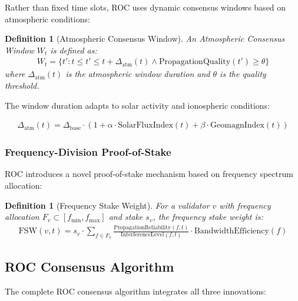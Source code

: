 \documentclass[11pt,a4paper]{article}
\newtheorem{definition}[theorem]{Definition}
\begin{document}
Rather than fixed time slots, ROC uses dynamic consensus windows based on atmospheric conditions:

\begin{definition}[Atmospheric Consensus Window]
An Atmospheric Consensus Window $W_t$ is defined as:
\begin{align}
W_t = \{t' : t \leq t' \leq t + \Delta_{\text{atm}}(t) \land \text{PropagationQuality}(t') \geq \theta\}
\end{align}
where $\Delta_{\text{atm}}(t)$ is the atmospheric window duration and $\theta$ is the quality threshold.
\end{definition}

The window duration adapts to solar activity and ionospheric conditions:

\begin{align}
\Delta_{\text{atm}}(t) = \Delta_{\text{base}} \cdot \left(1 + \alpha \cdot \text{SolarFluxIndex}(t) + \beta \cdot \text{GeomagnIndex}(t)\right)
\end{align}

\subsubsection{Frequency-Division Proof-of-Stake}

ROC introduces a novel proof-of-stake mechanism based on frequency spectrum allocation:

\begin{definition}[Frequency Stake Weight]
For a validator $v$ with frequency allocation $F_v \subset [f_{\min}, f_{\max}]$ and stake $s_v$, the frequency stake weight is:
\begin{align}
\text{FSW}(v, t) = s_v \cdot \sum_{f \in F_v} \frac{\text{PropagationReliability}(f, t)}{\text{InterferenceLevel}(f, t)} \cdot \text{BandwidthEfficiency}(f)
\end{align}
\end{definition}

\subsection{ROC Consensus Algorithm}

The complete ROC consensus algorithm integrates all three innovations:
\end{document}
